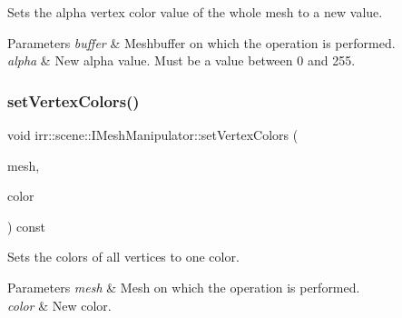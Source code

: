 Sets the alpha vertex color value of the whole mesh to a new value. 


\begin{DoxyParams}{Parameters}
{\em buffer} & Meshbuffer on which the operation is performed. \\
\hline
{\em alpha} & New alpha value. Must be a value between 0 and 255. \\
\hline
\end{DoxyParams}
\mbox{\label{classirr_1_1scene_1_1IMeshManipulator_a72bc31cb9468480698277f0f164e71ee}} 
\subsubsection{\texorpdfstring{set\+Vertex\+Colors()}{setVertexColors()}\hspace{0.1cm}{\footnotesize\ttfamily [1/2]}}
{\footnotesize\ttfamily void irr\+::scene\+::\+I\+Mesh\+Manipulator\+::set\+Vertex\+Colors (\begin{DoxyParamCaption}\item[{\hyperlink{classirr_1_1scene_1_1IMesh}{I\+Mesh} $\ast$}]{mesh,  }\item[{\hyperlink{classirr_1_1video_1_1SColor}{video\+::\+S\+Color}}]{color }\end{DoxyParamCaption}) const\hspace{0.3cm}{\ttfamily [inline]}}



Sets the colors of all vertices to one color. 


\begin{DoxyParams}{Parameters}
{\em mesh} & Mesh on which the operation is performed. \\
\hline
{\em color} & New color. \\
\hline
\end{DoxyParams}
\mbox{\label{classirr_1_1scene_1_1IMeshManipulator_ab13881bea577e0f0ffc03b102f29db6a}} 
